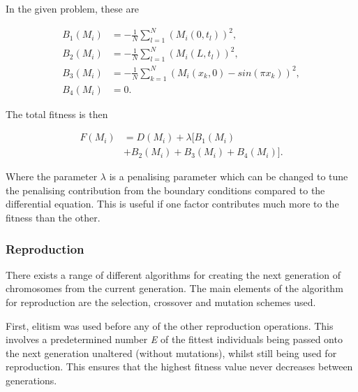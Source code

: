 \documentclass[multicolumn, 9pt]{extarticle}
\begin{document}
In the given problem, these are

\begin{align*}
	B_1(M_{i}) & = -\frac{1}{N} \sum_{l=1}^{N} \left( M_i(0, t_l)\right) ^2,     \\
	B_2(M_{i}) & = -\frac{1}{N} \sum_{l=1}^{N} (M_i(L, t_l))^2,                  \\
	B_3(M_{i}) & = -\frac{1}{N} \sum_{k=1}^{N} (M_i(x_k, 0) - sin(\pi x_{k}))^2, \\
	B_4(M_i)   & = 0.
\end{align*}


The total fitness is then

\begin{align*}
	F(M_{i}) & = D(M_{i}) + \lambda  [  B_1(M_{i})            \\
	         & +  B_2(M_{i})  +  B_3(M_{i})  + B_4(M_{i})  ].
\end{align*}

Where the parameter $\lambda$ is a penalising parameter which can be changed to tune the penalising contribution from the boundary conditions compared to the differential equation. This is useful if one factor contributes much more to the fitness than the other.

\subsubsection{Reproduction}
There exists a range of different algorithms for creating the next generation of chromosomes from the current generation. The main elements  of the algorithm for reproduction are the selection, crossover and mutation schemes used.

First, elitism was used before any of the other reproduction operations. This involves a predetermined number  \textit{E} of the fittest individuals being passed onto the next generation unaltered (without mutations), whilst still being used for reproduction. This ensures that the highest fitness value never decreases between generations.
\end{document}
